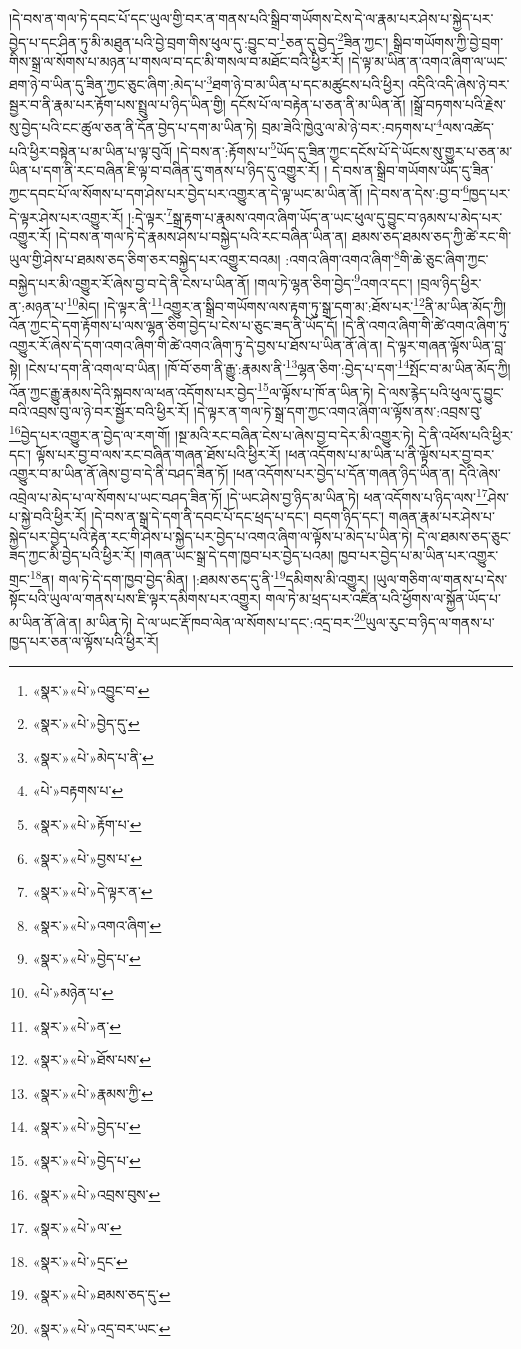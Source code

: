 །དེ་བས་ན་གལ་ཏེ་དབང་པོ་དང་ཡུལ་གྱི་བར་ན་གནས་པའི་སྒྲིབ་གཡོགས་ངེས་དེ་ལ་རྣམ་པར་ཤེས་པ་སྐྱེད་པར་བྱེད་པ་དང་ཤིན་ཏུ་མི་མཐུན་པའི་བྱེ་བྲག་གིས་ཕུལ་དུ་:བྱུང་བ་\footnote{«སྣར་»«པེ་»འབྱུང་བ་}ཅན་དུ་བྱེད་\footnote{«སྣར་»«པེ་»བྱེད་དུ་}ཟིན་ཀྱང་། སྒྲིབ་གཡོགས་ཀྱི་བྱེ་བྲག་གིས་སྒྲ་ལ་སོགས་པ་མཉན་པ་གསལ་བ་དང་མི་གསལ་བ་མཐོང་བའི་ཕྱིར་རོ། །དེ་ལྟ་མ་ཡིན་ན་འགའ་ཞིག་ལ་ཡང་ཐག་ཉེ་བ་ཡིན་དུ་ཟིན་ཀྱང་ཅུང་ཞིག་:མེད་པ་\footnote{«སྣར་»«པེ་»མེད་པ་ནི་}ཐག་ཉེ་བ་མ་ཡིན་པ་དང་མཚུངས་པའི་ཕྱིར། འདིའི་འདི་ཞེས་ཉེ་བར་སྦྱར་བ་ནི་རྣམ་པར་རྟོག་པས་སྤྲུལ་པ་ཉིད་ཡིན་གྱི། དངོས་པོ་ལ་བརྟེན་པ་ཅན་ནི་མ་ཡིན་ནོ། །སྒྲོ་བཏགས་པའི་རྗེས་སུ་བྱེད་པའི་ངང་ཚུལ་ཅན་ནི་དོན་བྱེད་པ་དག་མ་ཡིན་ཏེ། བྲམ་ཟེའི་ཁྱེའུ་ལ་མེ་ཉེ་བར་:བཏགས་པ་\footnote{«པེ་»བརྟགས་པ་}ལས་འཚེད་པའི་ཕྱིར་བསྟེན་པ་མ་ཡིན་པ་ལྟ་བུའོ། །དེ་བས་ན་:རྟོགས་པ་\footnote{«སྣར་»«པེ་»རྟོག་པ་}ཡོད་དུ་ཟིན་ཀྱང་དངོས་པོ་དེ་ཡོངས་སུ་གྱུར་པ་ཅན་མ་ཡིན་པ་དག་ནི་རང་བཞིན་ཇི་ལྟ་བ་བཞིན་དུ་གནས་པ་ཉིད་དུ་འགྱུར་རོ། །
དེ་བས་ན་སྒྲིབ་གཡོགས་ཡོད་དུ་ཟིན་ཀྱང་དབང་པོ་ལ་སོགས་པ་དག་ཤེས་པར་བྱེད་པར་འགྱུར་ན་དེ་ལྟ་ཡང་མ་ཡིན་ནོ། །དེ་བས་ན་དེས་:བྱ་བ་\footnote{«སྣར་»«པེ་»བྱས་པ་}ཁྱད་པར་དེ་ལྟར་ཤེས་པར་འགྱུར་རོ། །:དེ་ལྟར་\footnote{«སྣར་»«པེ་»དེ་ལྟར་ན་}སྒྲ་རྟག་པ་རྣམས་འགའ་ཞིག་ཡོད་ན་ཡང་ཕུལ་དུ་བྱུང་བ་ཉམས་པ་མེད་པར་འགྱུར་རོ། །དེ་བས་ན་གལ་ཏེ་དེ་རྣམས་ཤེས་པ་བསྐྱེད་པའི་རང་བཞིན་ཡིན་ན། ཐམས་ཅད་ཐམས་ཅད་ཀྱི་ཚེ་རང་གི་ཡུལ་གྱི་ཤེས་པ་ཐམས་ཅད་ཅིག་ཅར་བསྐྱེད་པར་འགྱུར་བའམ། :འགའ་ཞིག་འགའ་ཞིག་\footnote{«སྣར་»«པེ་»འགའ་ཞིག་}གི་ཆེ་ཅུང་ཞིག་ཀྱང་བསྐྱེད་པར་མི་འགྱུར་རོ་ཞེས་བྱ་བ་དེ་ནི་ངེས་པ་ཡིན་ནོ། །གལ་ཏེ་ལྷན་ཅིག་བྱེད་\footnote{«སྣར་»«པེ་»བྱེད་པ་}འགའ་དང་། །བྲལ་ཉིད་ཕྱིར་ན་:མཉན་པ་\footnote{«པེ་»མཉེན་པ་}མེད། །དེ་ལྟར་ནི་\footnote{«སྣར་»«པེ་»ན་}འགྱུར་ན་སྒྲིབ་གཡོགས་ལས་རྟག་ཏུ་སྒྲ་དག་མ་:ཐོས་པར་\footnote{«སྣར་»«པེ་»ཐོས་པས་}ནི་མ་ཡིན་མོད་ཀྱི། འོན་ཀྱང་དེ་དག་རྟོགས་པ་ལས་ལྷན་ཅིག་བྱེད་པ་ངེས་པ་ཅུང་ཟད་ནི་ཡོད་དོ། །དེ་ནི་འགའ་ཞིག་གི་ཚེ་འགའ་ཞིག་ཏུ་འགྱུར་རོ་ཞེས་དེ་དག་འགའ་ཞིག་གི་ཚེ་འགའ་ཞིག་ཏུ་དེ་བྱས་པ་ཐོས་པ་ཡིན་ནོ་ཞེ་ན། དེ་ལྟར་གཞན་ལྟོས་ཡིན་བླ་སྟེ། །ངེས་པ་དག་ནི་འགལ་བ་ཡིན། །ཁོ་བོ་ཅག་ནི་རྒྱུ་:རྣམས་ནི་\footnote{«སྣར་»«པེ་»རྣམས་ཀྱི་}ལྷན་ཅིག་:བྱེད་པ་དག་\footnote{«སྣར་»«པེ་»བྱེད་པ་}སྤོང་བ་མ་ཡིན་མོད་ཀྱི། འོན་ཀྱང་རྒྱུ་རྣམས་དེའི་སྐབས་ལ་ཕན་འདོགས་པར་བྱེད་\footnote{«སྣར་»«པེ་»བྱེད་པ་}ལ་ལྟོས་པ་ཁོ་ན་ཡིན་ཏེ། དེ་ལས་རྙེད་པའི་ཕུལ་དུ་བྱུང་བའི་འབྲས་བུ་ལ་ཉེ་བར་སྦྱོར་བའི་ཕྱིར་རོ། །དེ་ལྟར་ན་གལ་ཏེ་སྒྲ་དག་ཀྱང་འགའ་ཞིག་ལ་ལྟོས་ནས་:འབྲས་བུ་\footnote{«སྣར་»«པེ་»འབྲས་བུས་}བྱེད་པར་འགྱུར་ན་བྱེད་ལ་རག་གོ། །སྔ་མའི་རང་བཞིན་ངེས་པ་ཞེས་བྱ་བ་དེར་མི་འགྱུར་ཏེ། དེ་ནི་འཕོས་པའི་ཕྱིར་དང་། ལྟོས་པར་བྱ་བ་ལས་རང་བཞིན་གཞན་ཐོས་པའི་ཕྱིར་རོ། །ཕན་འདོགས་པ་མ་ཡིན་པ་ནི་ལྟོས་པར་བྱ་བར་འགྱུར་བ་མ་ཡིན་ནོ་ཞེས་བྱ་བ་དེ་ནི་བཤད་ཟིན་ཏོ། །ཕན་འདོགས་པར་བྱེད་པ་དོན་གཞན་ཉིད་ཡིན་ན། དེའི་ཞེས་འབྲེལ་པ་མེད་པ་ལ་སོགས་པ་ཡང་བཤད་ཟིན་ཏོ། །དེ་ཡང་ཤེས་བྱ་ཉིད་མ་ཡིན་ཏེ། ཕན་འདོགས་པ་ཉིད་ལས་\footnote{«སྣར་»«པེ་»ལ་}ཤེས་པ་སྐྱེ་བའི་ཕྱིར་རོ། །དེ་བས་ན་སྒྲ་དེ་དག་ནི་དབང་པོ་དང་ཕྲད་པ་དང་། བདག་ཉིད་དང་། གཞན་རྣམ་པར་ཤེས་པ་སྐྱེད་པར་བྱེད་པའི་རྟེན་རང་གི་ཤེས་པ་སྐྱེད་པར་བྱེད་པ་འགའ་ཞིག་ལ་ལྟོས་པ་མེད་པ་ཡིན་ཏེ། དེ་ལ་ཐམས་ཅད་ཅུང་ཟད་ཀྱང་མི་བྱེད་པའི་ཕྱིར་རོ། །གཞན་ཡང་སྒྲ་དེ་དག་ཁྱབ་པར་བྱེད་པའམ། ཁྱབ་པར་བྱེད་པ་མ་ཡིན་པར་འགྱུར་གྲང་\footnote{«སྣར་»«པེ་»དྲང་}ན། གལ་ཏེ་དེ་དག་ཁྱབ་བྱེད་མིན། །:ཐམས་ཅད་དུ་ནི་\footnote{«སྣར་»«པེ་»ཐམས་ཅད་དུ་}དམིགས་མི་འགྱུར། །ཡུལ་གཅིག་ལ་གནས་པ་དེས་སྟོང་པའི་ཡུལ་ལ་གནས་པས་ཇི་ལྟར་དམིགས་པར་འགྱུར། གལ་ཏེ་མ་ཕྲད་པར་འཛིན་པའི་ཕྱོགས་ལ་སྐྱོན་ཡོད་པ་མ་ཡིན་ནོ་ཞེ་ན། མ་ཡིན་ཏེ། དེ་ལ་ཡང་རྡོ་ཁབ་ལེན་ལ་སོགས་པ་དང་:འདྲ་བར་\footnote{«སྣར་»«པེ་»འདྲ་བར་ཡང་}ཡུལ་རུང་བ་ཉིད་ལ་གནས་པ་ཁྱད་པར་ཅན་ལ་ལྟོས་པའི་ཕྱིར་རོ། 